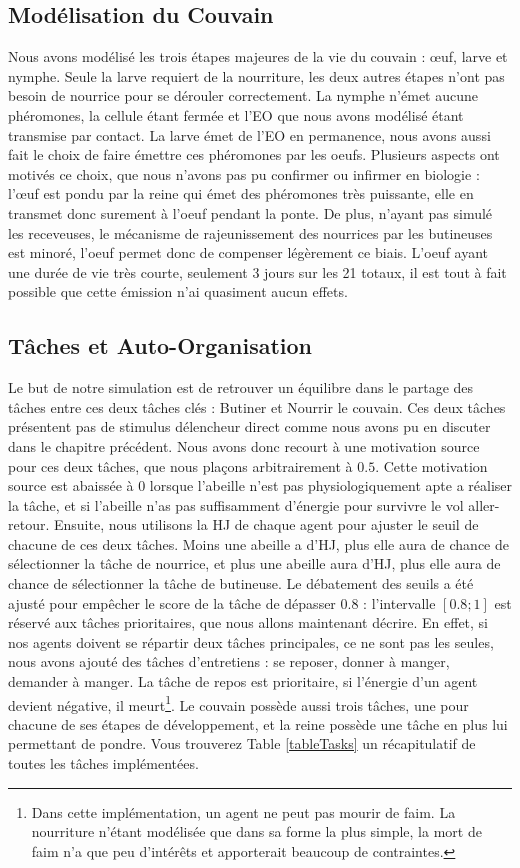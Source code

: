 		
		\subsection{Modélisation du Couvain}
		
			Nous avons modélisé les trois étapes majeures de la vie du couvain : œuf, larve et nymphe. Seule la larve requiert de la nourriture, les deux autres étapes n'ont pas besoin de nourrice pour se dérouler correctement. La nymphe n'émet aucune phéromones, la cellule étant fermée et l'EO que nous avons modélisé étant transmise par contact. La larve émet de l'EO en permanence, nous avons aussi fait le choix de faire émettre ces phéromones par les oeufs. Plusieurs aspects ont motivés ce choix, que nous n'avons pas pu confirmer ou infirmer en biologie : l'œuf est pondu par la reine qui émet des phéromones très puissante, elle en transmet donc surement à l'oeuf pendant la ponte. De plus, n'ayant pas simulé les receveuses, le mécanisme de rajeunissement des nourrices par les butineuses est minoré, l'oeuf permet donc de compenser légèrement ce biais. L'oeuf ayant une durée de vie très courte, seulement 3 jours sur les 21 totaux, il est tout à fait possible que cette émission n'ai quasiment aucun effets.
		
	\subsection{Tâches et Auto-Organisation}
		Le but de notre simulation est de retrouver un équilibre dans le partage des tâches entre ces deux tâches clés : Butiner et Nourrir le couvain. Ces deux tâches présentent pas de stimulus délencheur direct comme nous avons pu en discuter dans le chapitre précédent. Nous avons donc recourt à une motivation source pour ces deux tâches, que nous plaçons arbitrairement à $0.5$. Cette motivation source est abaissée à 0 lorsque l'abeille n'est pas physiologiquement apte a réaliser la tâche, et si l'abeille n'as pas suffisamment d'énergie pour survivre le vol aller-retour. Ensuite, nous utilisons la HJ de chaque agent pour ajuster le seuil de chacune de ces deux tâches. Moins une abeille a d'HJ, plus elle aura de chance de sélectionner la tâche de nourrice, et plus une abeille aura d'HJ, plus elle aura de chance de sélectionner la tâche de butineuse. Le débatement des seuils a été ajusté pour empêcher le score de la tâche de dépasser $0.8$ : l'intervalle $[0.8 ; 1]$ est réservé aux tâches prioritaires, que nous allons maintenant décrire. En effet, si nos agents doivent se répartir deux tâches principales, ce ne sont pas les seules, nous avons ajouté des tâches d'entretiens : se reposer, donner à manger, demander à manger. La tâche de repos est prioritaire, si l'énergie d'un agent devient négative, il meurt\footnote{Dans cette implémentation, un agent ne peut pas mourir de faim. La nourriture n'étant modélisée que dans sa forme la plus simple, la mort de faim n'a que peu d'intérêts et apporterait beaucoup de contraintes.}. Le couvain possède aussi trois tâches, une pour chacune de ses étapes de développement, et la reine possède une tâche en plus lui permettant de pondre. Vous trouverez Table \ref{tableTasks} un récapitulatif de toutes les tâches implémentées.
		
